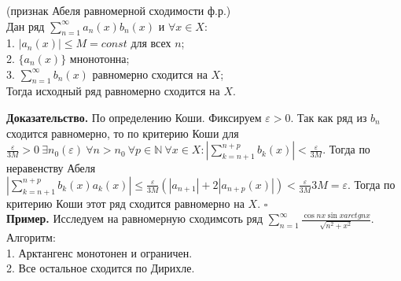 \begin{theor}
    (признак Абеля равномерной сходимости ф.р.)\\
Дан ряд $\sum\limits_{n=1}^{\infty} a_n(x)b_n(x)$ и $\forall x\in X$:\\
1. $|a_n(x)|\leqslant M=const$ для всех $n$;\\
2.  $\{a_n(x)\} $ мнонотонна;\\
3. $\sum\limits_{n=1}^{\infty} b_n(x)$ равномерно сходится на $X$;\\
Тогда исходный ряд равномерно сходится на  $X$.
\end{theor}
\textbf{Доказательство.}  По определению Коши. Фиксируем $\varepsilon>0$.
Так как ряд из $b_n$ сходится равномерно, то по критерию Коши для
$\frac{\varepsilon}{3M}>0~\exists n_0(\varepsilon)~\forall n>n_0~\forall p\in
\mathbb{N}~ \forall x\in X: |\sum\limits_{k=n+1}^{n+p} b_k(x)|<
\frac{\varepsilon}{3M}$. Тогда по неравенству Абеля 
$|\sum\limits_{k=n+1}^{n+p} b_k(x)a_k(x)|\leqslant \frac{\varepsilon}{3M}
(|a_{n+1}|+2|a_{n+p}(x)|)<\frac{\varepsilon}{3M}3M=\varepsilon$.
Тогда по критерию Коши этот ряд сходится равномерно на $X$. $\square$ \\
\textbf{Пример.} Исследуем на равномерную сходимсоть ряд 
$\sum\limits_{n=1}^{\infty} \frac{\cos{nx}\sin{x}arctg{nx}}{\sqrt{n^2+x^2}}$. 
Алгоритм:\\
1. Арктангенс монотонен и ограничен.\\
2. Все остальное сходится по Дирихле.
